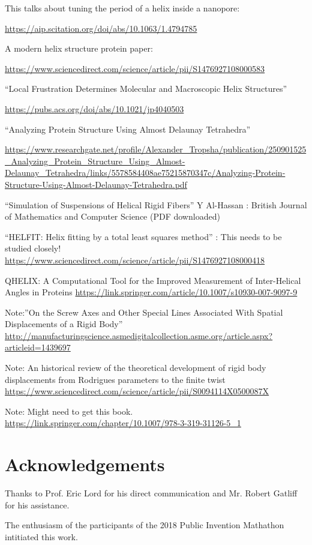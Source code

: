 \documentclass[11pt]{article}
\begin{document}
{This talks about tuning the period of a helix inside a nanopore:

\url{https://aip.scitation.org/doi/abs/10.1063/1.4794785}

A modern helix structure protein paper:

\url{https://www.sciencedirect.com/science/article/pii/S1476927108000583}

``Local Frustration Determines Molecular and Macroscopic Helix Structures''

\url{https://pubs.acs.org/doi/abs/10.1021/jp4040503}

``Analyzing Protein Structure Using Almost Delaunay Tetrahedra''

\url{https://www.researchgate.net/profile/Alexander_Tropsha/publication/250901525_Analyzing_Protein_Structure_Using_Almost-Delaunay_Tetrahedra/links/5578584408ae75215870347c/Analyzing-Protein-Structure-Using-Almost-Delaunay-Tetrahedra.pdf}

``Simulation of Suspensions of Helical Rigid Fibers'' Y Al-Hassan : British Journal of Mathematics and Computer Science
(PDF downloaded)

``HELFIT: Helix fitting by a total least squares method'' : This needs to be studied closely!
\url{https://www.sciencedirect.com/science/article/pii/S1476927108000418}

QHELIX: A Computational Tool for the Improved Measurement of Inter-Helical Angles in Proteins
\url{https://link.springer.com/article/10.1007/s10930-007-9097-9}

Note:''On the Screw Axes and Other Special Lines Associated With Spatial Displacements of a Rigid Body''
\url{http://manufacturingscience.asmedigitalcollection.asme.org/article.aspx?articleid=1439697}

Note: An historical review of the theoretical development of rigid body displacements from Rodrigues parameters to the finite twist
\url{https://www.sciencedirect.com/science/article/pii/S0094114X0500087X}

Note: Might need to get this book.
\url{https://link.springer.com/chapter/10.1007/978-3-319-31126-5_1}


\section{Acknowledgements}

Thanks to Prof. Eric Lord for his direct communication and Mr. Robert Gatliff for his
assistance.

The enthusiasm of the participants of the 2018 Public Invention Mathathon
intitiated this work.

}
\end{document}

